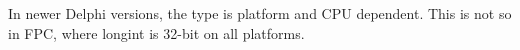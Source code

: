\begin{remark}
In newer Delphi versions, the  type is platform and CPU dependent.
This is not so in FPC, where longint is 32-bit on all platforms.
\end{remark}




